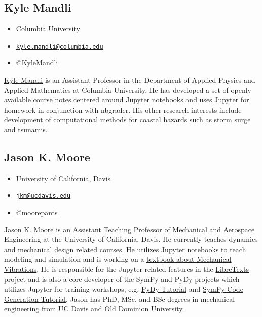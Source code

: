 \documentclass[]{book}
\providecommand{\tightlist}{%
  \setlength{\itemsep}{0pt}\setlength{\parskip}{0pt}}
\begin{document}
\subsection{Kyle Mandli}\label{kyle-mandli}

\begin{itemize}
\tightlist
\item
  Columbia University
\item
  \href{mailto:kyle.mandli@columbia.edu}{\nolinkurl{kyle.mandli@columbia.edu}}
\item
  \href{https://twitter.com/KyleMandli}{@KyleMandli}
\end{itemize}

\href{https://www.columbia.edu/~ktm2132}{Kyle Mandli} is an Assistant
Professor in the Department of Applied Physics and Applied Mathematics
at Columbia University. He has developed a set of openly available
course notes centered around Jupyter notebooks and uses Jupyter for
homework in conjunction with nbgrader. His other research interests
include development of computational methods for coastal hazards such as
storm surge and tsunamis.

\subsection{Jason K. Moore}\label{jason-k.-moore}

\begin{itemize}
\tightlist
\item
  University of California, Davis
\item
  \href{mailto:jkm@ucdavis.edu}{\nolinkurl{jkm@ucdavis.edu}}
\item
  \href{https://twitter.com/moorepants}{@moorepants}
\end{itemize}

\href{http://moorepants.info/}{Jason K. Moore} is an Assistant Teaching
Professor of Mechanical and Aerospace Engineering at the University of
California, Davis. He currently teaches dynamics and mechanical design
related courses. He utilizes Jupyter notebooks to teach modeling and
simulation and is working on a
\href{https://moorepants.github.io/resonance}{textbook about Mechanical
Vibrations}. He is responsible for the Jupyter related features in the
\href{http://libretexts.org}{LibreTexts project} and is also a core
developer of the \href{http://sympy.org/}{SymPy} and
\href{http://pydy.org/}{PyDy} projects which utilizes Jupyter for
training workshops, e.g.
\href{https://www.sympy.org/scipy-2017-codegen-tutorial/}{PyDy Tutorial}
and \href{https://github.com/pydy/pydy-tutorial-human-standing}{SymPy
Code Generation Tutorial}. Jason has PhD, MSc, and BSc degrees in
mechanical engineering from UC Davis and Old Dominion University.
\end{document}

